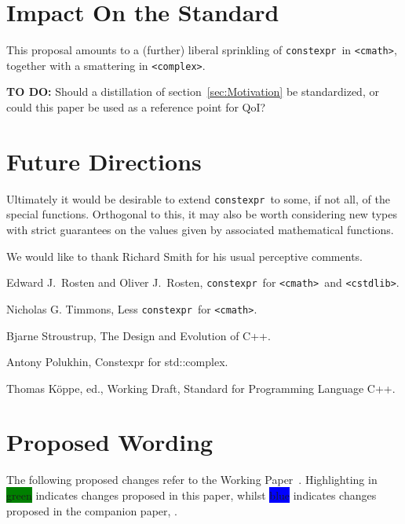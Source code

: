 \documentclass[prd,twocolumn,amsmath,amssymb,nofootinbib,eqsecnum]{revtex4-1}
\newcommand{\constexpr}{\code{constexpr}\xspace}
\newcommand{\code}[1]{{\tt #1}}
\newcommand{\header}[1]{{\tt <#1>}}
\newcommand{\cmath}{\header{cmath}}
\newcommand{\complex}{\header{complex}}
\newcommand{\cstdlib}{\header{cstdlib}}
\newcommand{\highlight}[1]{\colorbox{green}{\!\!\!\! #1}}
\newcommand{\oldhighlight}[1]{\colorbox{blue}{\!\!\!\! #1}}
\newcommand{\sect}[1]{section~\ref{sec:#1}}
\begin{document}
\section{Impact On the Standard}

This proposal amounts to a (further) liberal sprinkling of \constexpr\ in \cmath, together with a smattering in \complex.

{\bf TO DO:} Should a distillation of \sect{Motivation} be standardized, or could this paper be used as a reference point for QoI?

\section{Future Directions}

Ultimately it would be desirable to extend \constexpr\ to some, if not all, of the special functions. Orthogonal to this, it may also be worth considering new types with strict guarantees on the values given by associated mathematical functions.


\begin{acknowledgments}
	We would like to thank Richard Smith for his usual perceptive comments.
\end{acknowledgments}


\begin{thebibliography}{1}
	 Edward J.~Rosten and Oliver J.~Rosten, \constexpr\ for \cmath\ and \cstdlib.

	 Nicholas G. Timmons, Less \constexpr\ for \cmath.
	
	 Bjarne Stroustrup, The Design and Evolution of C++.

	 Antony Polukhin, Constexpr for std::complex.	
		
	 Thomas K\"oppe, ed., Working Draft, Standard for Programming Language C++.	
\end{thebibliography}

\newpage

\onecolumngrid

\section{Proposed Wording}

\setlength{\parindent}{0pt}


The following proposed changes refer to the Working Paper~\cite{WorkingPaper}. Highlighting in \highlight{green} indicates changes proposed in this paper, whilst \oldhighlight{blue} indicates changes proposed in the companion paper, \cite{Rosten-constexpr}.
\end{document}
